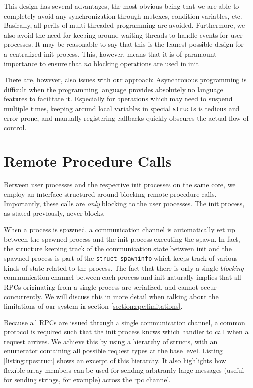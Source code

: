 This design has several advantages, the most obvious being that we are able to completely avoid any synchronization through mutexes, condition variables, etc. Basically, all perils of multi-threaded programming are avoided. Furthermore, we also avoid the need for keeping around waiting threads to handle events for user processes. It may be reasonable to say that this is the leanest-possible design for a centralized init process. This, however, means that it is of paramount importance to ensure that \textit{no} blocking operations are used in init

There are, however, also issues with our approach: Asynchronous programming is difficult when the programming language provides absolutely no language features to facilitate it. Especially for operations which may need to suspend multiple times, keeping around local variables in special \texttt{struct}s is tedious and error-prone, and manually registering callbacks quickly obscures the actual flow of control.

\section{Remote Procedure Calls}
\label{section:rpc:rpc}
Between user processes and the respective init processes on the same core, we employ an interface structured around blocking remote procedure calls. Importantly, these calls are \textit{only} blocking to the user processes. The init process, as stated previously, never blocks.

When a process is spawned, a communication channel is automatically set up between the spawned process and the init process executing the spawn. In fact, the structure keeping track of the communication state between init and the spawned process is part of the \texttt{struct spawninfo} which keeps track of various kinds of state related to the process. The fact that there is only a single \textit{blocking} communication channel between each process and init naturally implies that all RPCs originating from a single process are serialized, and cannot occur concurrently. We will discuss this in more detail when talking about the limitations of our system in section \ref{section:rpc:limitations}.

Because all RPCs are issued through a single communication channel, a common protocol is required such that the init process knows which handler to call when a request arrives.
We achieve this by using a hierarchy of structs, with an enumerator containing all possible request types at the base level. Listing \ref{listing:rpcstruct} shows an excerpt of this hierarchy. It also highlights how flexible array members can be used for sending arbitrarily large messages (useful for sending strings, for example) across the rpc channel.

